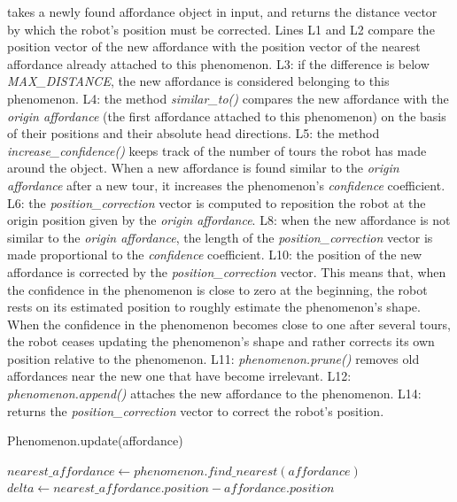 \documentclass[pmlr]{jmlr}%
\begin{document}
 takes a newly found affordance object in input, and returns the distance vector by which the robot's position must be corrected. 
Lines L1 and L2 compare the position vector of the new affordance with the position vector of the nearest affordance already attached to this phenomenon.
L3: if the difference is below \textit{MAX\_DISTANCE}, the new affordance is considered belonging to this phenomenon. 
L4: the method \textit{similar\_to()} compares the new affordance with the \textit{origin affordance} (the first affordance attached to this phenomenon) on the basis of their positions and their absolute head directions. 
L5: the method \textit{increase\_confidence()} keeps track of the number of tours the robot has made around the object. 
When a new affordance is found similar to the \textit{origin affordance} after a new tour, it increases the phenomenon's \textit{confidence} coefficient.
L6: the \textit{position\_correction} vector is computed to reposition the robot at the origin position given by the \textit{origin affordance}.
L8: when the new affordance is not similar to the \textit{origin affordance}, the length of the \textit{position\_correction} vector is made proportional to  the \textit{confidence} coefficient. 
L10: the position of the new affordance is corrected by the \textit{position\_correction} vector.
This means that, when the confidence in the phenomenon is close to zero at the beginning, the robot rests on its estimated position to roughly estimate the phenomenon's shape. 
When the confidence in the phenomenon becomes close to one after several tours, the robot ceases updating the phenomenon's shape and rather corrects its own position relative to the phenomenon. 
L11: \textit{phenomenon.prune()} removes old affordances near the new one that have become irrelevant. 
L12: \textit{phenomenon.append()} attaches the new affordance to the phenomenon.
L14: returns the \textit{position\_correction} vector to correct the robot's position. 

\begin{algorithm2e}
	\caption{Phenomenon.update(affordance)}
	\label{alg:phenomenon}
	$nearest\_affordance \leftarrow phenomenon.find\_nearest(affordance)$\;
	$delta \leftarrow nearest\_affordance.position - affordance.position$\;
	
\end{algorithm2e}
\end{document}
